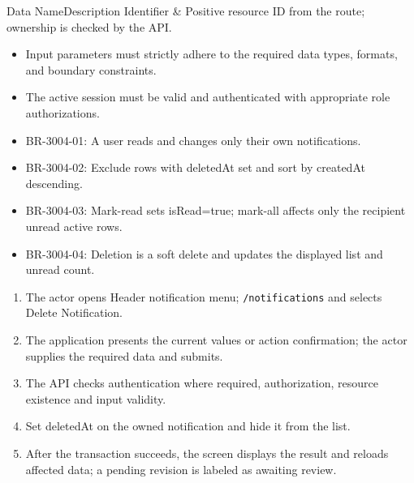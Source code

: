 
\begin{specdatatable}{Data Name}{Description}
Identifier & Positive resource ID from the route; ownership is checked by the API.\\ \hline
\end{specdatatable}

\begin{itemize}[leftmargin=1.6em,topsep=3pt,itemsep=2pt,parsep=0pt,label=$\bullet$]
    \item Input parameters must strictly adhere to the required data types, formats, and boundary constraints.
    \item The active session must be valid and authenticated with appropriate role authorizations.
\end{itemize}

\begin{itemize}[leftmargin=1.6em,topsep=3pt,itemsep=2pt,parsep=0pt,label=$\bullet$]\brrulelist
    \item BR-3004-01: A user reads and changes only their own notifications.
    \item BR-3004-02: Exclude rows with deletedAt set and sort by createdAt descending.
    \item BR-3004-03: Mark-read sets isRead=true; mark-all affects only the recipient unread active rows.
    \item BR-3004-04: Deletion is a soft delete and updates the displayed list and unread count.
\end{itemize}

\begin{enumerate}[leftmargin=1.8em,topsep=3pt,itemsep=2pt,parsep=0pt]
    \item The actor opens Header notification menu; \texttt{/\allowbreak{}notifications} and selects Delete Notification.
    \item The application presents the current values or action confirmation; the actor supplies the required data and submits.
    \item The API checks authentication where required, authorization, resource existence and input validity.
    \item Set deletedAt on the owned notification and hide it from the list.
    \item After the transaction succeeds, the screen displays the result and reloads affected data; a pending revision is labeled as awaiting review.
\end{enumerate}

